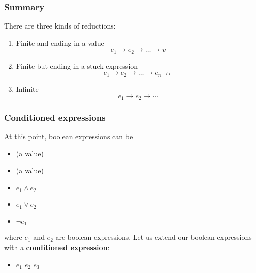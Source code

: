 %
\begin{frame}
\frametitle{Summary}

There are three kinds of reductions:
\begin{enumerate}

  \item Finite and ending in a value
  \[e_1 \rightarrow e_2 \rightarrow \dots \rightarrow v\]

  \item Finite but ending in a stuck expression
  \[e_1 \rightarrow e_2 \rightarrow \dots \rightarrow e_n
    \nrightarrow\]

  \item Infinite
  \[e_1 \rightarrow e_2 \rightarrow \cdots\]

\end{enumerate}

\end{frame}

%
\begin{frame}
\frametitle{Conditioned expressions}

At this point, boolean expressions can be
\begin{itemize}

  \item \Xtrue (a value)

  \item \Xfalse (a value)

  \item \(e_1 \wedge e_2\)

  \item \(e_1 \vee e_2\)

  \item \(\neg e_1\)

\end{itemize}
where \(e_1\) and \(e_2\) are boolean expressions. Let us
extend our boolean expressions with a \textbf{conditioned expression}:
\begin{itemize}
  \item \Xif \(e_1\) \Xthen \(e_2\) \Xelse \(e_3\)
\end{itemize}

\end{frame}

